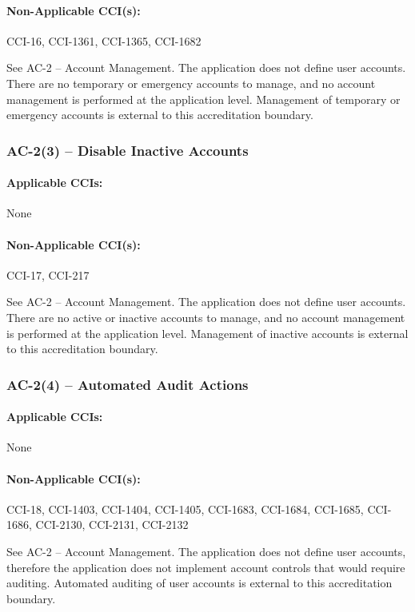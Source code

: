 \documentclass[letterpaper, 10pt, twoside]{article}
\begin{document}
\paragraph{Non-Applicable CCI(s):} CCI-16, CCI-1361, CCI-1365, CCI-1682

See AC-2 – Account Management. The application does not define user accounts. There are no temporary or emergency accounts to manage, and no account management is performed at the application level. Management of temporary or emergency accounts is external to this accreditation boundary.

\subsubsection{AC-2(3) -- Disable Inactive Accounts}

\paragraph{Applicable CCIs:} None

\paragraph{Non-Applicable CCI(s):} CCI-17, CCI-217

See AC-2 – Account Management. The application does not define user accounts. There are no active or inactive accounts to manage, and no account management is performed at the application level. Management of inactive accounts is external to this accreditation boundary.

\subsubsection{AC-2(4) -- Automated Audit Actions}

\paragraph{Applicable CCIs:} None

\paragraph{Non-Applicable CCI(s):} CCI-18, CCI-1403, CCI-1404, CCI-1405, CCI-1683, CCI-1684, CCI-1685, CCI-1686, CCI-2130, CCI-2131, CCI-2132

See AC-2 – Account Management. The application does not define user accounts, therefore the application does not implement account controls that would require auditing. Automated auditing of user accounts is external to this accreditation boundary.
\end{document}
